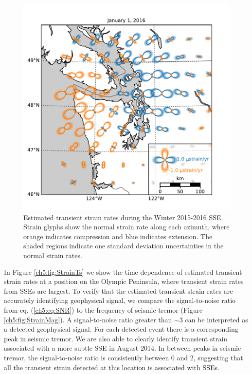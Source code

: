 \begin{figure}
\includegraphics{ch5/figures/strain_map/strain-map.pdf}
\caption{Estimated transient strain rates during the Winter 2015-2016 SSE. Strain glyphs show the normal strain rate along each azimuth, where orange indicates compression and blue indicates extension. The shaded regions indicate one standard deviation uncertainties in the normal strain rates.}   
\label{ch5:fig:StrainMap}
\end{figure}

In Figure \ref{ch5:fig:StrainTs} we show the time dependence of estimated transient strain rates at a position on the Olympic Peninsula, where transient strain rates from SSEs are largest. To verify that the estimated transient strain rates are accurately identifying geophysical signal, we compare the signal-to-noise ratio from eq. (\ref{ch5:eq:SNR}) to the frequency of seismic tremor (Figure \ref{ch5:fig:StrainMag}). A signal-to-noise ratio greater than ${\sim}3$ can be interpreted as a detected geophysical signal. For each detected event there is a corresponding peak in seismic tremor. We are also able to clearly identify transient strain associated with a more subtle SSE in August 2014. In between peaks in seismic tremor, the signal-to-noise ratio is consistently between 0 and 2, suggesting that all the transient strain detected at this location is associated with SSEs.

